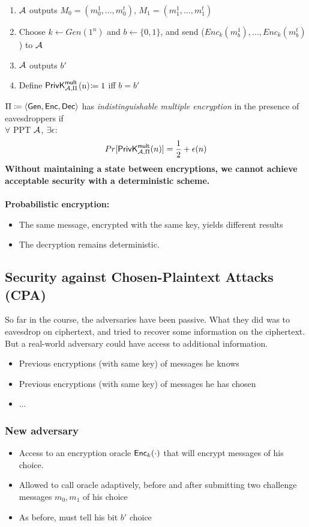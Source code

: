 \documentclass[12pt]{article}
\begin{document}
\begin{enumerate}
\item $\mathcal{A}$ outputs $M_0 = (m_0^1,\dots,m_0^t)$, $M_1 = (m_1^1,\dots,m_1^t)$
\item Choose $k \leftarrow Gen(1^n)$ and $b \leftarrow \{0,1\}$, and send ($Enc_k(m_b^1),\dots,Enc_k(m_b^t)$) to $\mathcal{A}$
\item $\mathcal{A}$ outputs $b'$
\item Define $\mathsf{PrivK}_{\mathcal{A},\Pi}^\mathsf{mult}$(n)$\coloneqq 1$ iff $b=b'$
\end{enumerate}
\newpage
$\Pi \coloneqq \langle \operatorname{\mathsf{Gen}}, \operatorname{\mathsf{Enc}}, \operatorname{\mathsf{Dec}} \rangle$ has \emph{indistinguishable multiple encryption} in the presence of eavesdroppers if\\
$\forall$ PPT $\mathcal{A}$, $\exists \epsilon$:
\begin{equation*}
Pr[\mathsf{PrivK}_{\mathcal{A},\Pi}^\mathsf{mult}(n)] = \frac{1}{2} + \epsilon(n)
\end{equation*}
\textbf{Without maintaining a state between encryptions, we cannot achieve acceptable security with a deterministic scheme.}\\\\
\textbf{Probabilistic encryption:}
\begin{itemize}
\item The same message, encrypted with the same key, yields different results
\item The decryption remains deterministic.
\end{itemize}
\subsection{Security against Chosen-Plaintext Attacks (CPA)}
So far in the course, the adversaries have been passive. What they did was to eavesdrop on ciphertext, and tried to recover some information on the ciphertext.\\
But a real-world adversary could have access to additional information.
\begin{itemize}
\item Previous encryptions (with same key) of messages he knows
\item Previous encryptions (with same key) of messages he has chosen
\item ...
\end{itemize}

\subsubsection{New adversary}
\begin{itemize}
\item Access to an encryption oracle $\operatorname{\mathsf{Enc}}_k(\cdot)$ that will encrypt messages of his choice.
\item Allowed to call oracle adaptively, before and after submitting two challenge messages $m_0, m_1$ of his choice
\item As before, must tell his bit $b'$ choice
\end{itemize}
\end{document}
